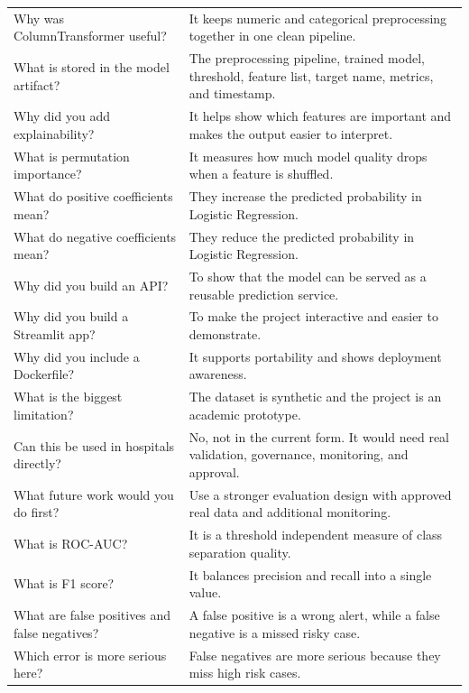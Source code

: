 \documentclass[12pt,a4paper,openany]{report}
\begin{document}
\begin{longtable}{p{6cm} p{8cm}}
    Why was ColumnTransformer useful? & It keeps numeric and categorical preprocessing together in one clean pipeline. \\
    What is stored in the model artifact? & The preprocessing pipeline, trained model, threshold, feature list, target name, metrics, and timestamp. \\
    Why did you add explainability? & It helps show which features are important and makes the output easier to interpret. \\
    What is permutation importance? & It measures how much model quality drops when a feature is shuffled. \\
    What do positive coefficients mean? & They increase the predicted probability in Logistic Regression. \\
    What do negative coefficients mean? & They reduce the predicted probability in Logistic Regression. \\
    Why did you build an API? & To show that the model can be served as a reusable prediction service. \\
    Why did you build a Streamlit app? & To make the project interactive and easier to demonstrate. \\
    Why did you include a Dockerfile? & It supports portability and shows deployment awareness. \\
    What is the biggest limitation? & The dataset is synthetic and the project is an academic prototype. \\
    Can this be used in hospitals directly? & No, not in the current form. It would need real validation, governance, monitoring, and approval. \\
    What future work would you do first? & Use a stronger evaluation design with approved real data and additional monitoring. \\
    What is ROC-AUC? & It is a threshold independent measure of class separation quality. \\
    What is F1 score? & It balances precision and recall into a single value. \\
    What are false positives and false negatives? & A false positive is a wrong alert, while a false negative is a missed risky case. \\
    Which error is more serious here? & False negatives are more serious because they miss high risk cases. \\
    \bottomrule
    \end{longtable}

    \appendix
\end{document}
